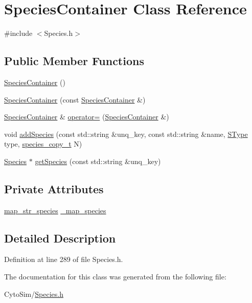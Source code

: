 \hypertarget{classSpeciesContainer}{\section{Species\-Container Class Reference}
\label{classSpeciesContainer}
}


{\ttfamily \#include $<$Species.\-h$>$}

\subsection*{Public Member Functions}
\begin{DoxyCompactItemize}
\item 
\hyperlink{group__Chemistry_gac505d1ddbf8783427c084d18eb568404}{Species\-Container} ()
\item 
\hyperlink{group__Chemistry_gac472c110d61ce09f6b2c36aca27b42b9}{Species\-Container} (const \hyperlink{classSpeciesContainer}{Species\-Container} \&)
\item 
\hyperlink{classSpeciesContainer}{Species\-Container} \& \hyperlink{group__Chemistry_ga6e248939edbee601bf6d6058ef68603c}{operator=} (\hyperlink{classSpeciesContainer}{Species\-Container} \&)
\item 
void \hyperlink{group__Chemistry_ga80e58a9c06521c2bb7e4e89a1de4ac79}{add\-Species} (const std\-::string \&unq\-\_\-key, const std\-::string \&name, \hyperlink{group__Chemistry_ga49104ff0a7d4118feb179c2f1c906f12}{S\-Type} type, \hyperlink{common_8h_a3503f321fd36304ee274141275cca586}{species\-\_\-copy\-\_\-t} N)
\item 
\hyperlink{classSpecies}{Species} $\ast$ \hyperlink{group__Chemistry_gaf4a162a1737e9434f27bab0210670127}{get\-Species} (const std\-::string \&unq\-\_\-key)
\end{DoxyCompactItemize}
\subsection*{Private Attributes}
\begin{DoxyCompactItemize}
\item 
\hyperlink{group__Chemistry_ga19c0082cabeed7d195eb9a1bc1aca13f}{map\-\_\-str\-\_\-species} \hyperlink{group__Chemistry_gab3e597371bf2edebc968a6980479e2da}{\-\_\-map\-\_\-species}
\end{DoxyCompactItemize}


\subsection{Detailed Description}


Definition at line 289 of file Species.\-h.



The documentation for this class was generated from the following file\-:\begin{DoxyCompactItemize}
\item 
Cyto\-Sim/\hyperlink{Species_8h}{Species.\-h}\end{DoxyCompactItemize}
